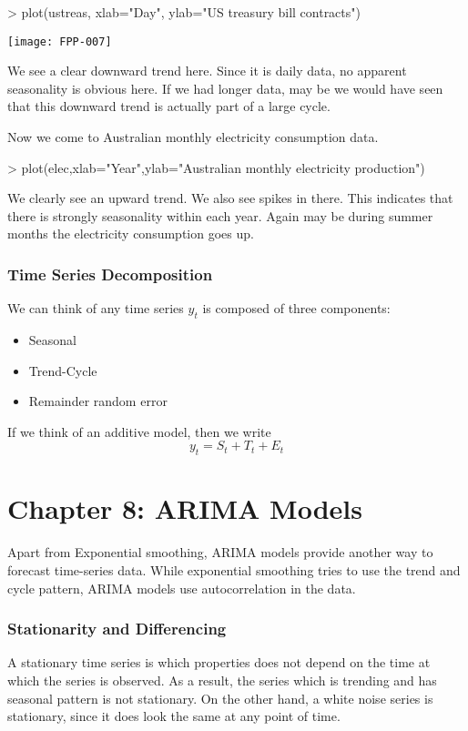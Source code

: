 \documentclass{article}
\begin{document}
\begin{Schunk}
\begin{Sinput}
> plot(ustreas, xlab="Day", ylab="US treasury bill contracts")
\end{Sinput}
\end{Schunk}
\texttt{[image: FPP-007]}

We see a clear downward trend here. Since it is daily data, no apparent seasonality is obvious here. If we had longer data, may be we would have seen that this downward trend is actually part of a large cycle.

Now we come to Australian monthly electricity consumption data. 
\begin{Schunk}
\begin{Sinput}
> plot(elec,xlab="Year",ylab="Australian monthly electricity production")
\end{Sinput}
\end{Schunk}

We clearly see an upward trend. We also see spikes in there. This indicates that
there is strongly seasonality within each year. Again may be during summer months the electricity consumption goes up. 

\section{Time Series Decomposition}

We can think of any time series $y_t$ is composed of three components:
\begin{itemize}
  \item{Seasonal}
  \item{Trend-Cycle}
  \item{Remainder random error}
\end{itemize}

If we think of an additive model, then we write
$$y_t=S_t+T_t+E_t$$

\part{Chapter 8: ARIMA Models}

Apart from Exponential smoothing, ARIMA models provide another way to forecast time-series data. While exponential smoothing tries to use the trend and cycle pattern, ARIMA models use autocorrelation in the data. 

\section{Stationarity and Differencing}
A stationary time series is which properties does not depend on the time at which the series is observed. As a result, the series which is trending and has seasonal pattern is not stationary. On the other hand, a white noise series is stationary, since it does look the same at any point of time. 
\end{document}
